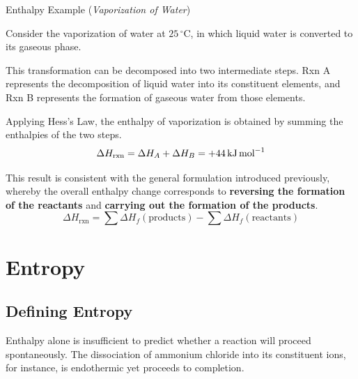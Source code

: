 \documentclass[10pt]{article}
\begin{document}
    \begin{core}{Enthalpy Example (\textit{Vaporization of Water})}

      Consider the vaporization of water at $25\,^\circ$C, in which liquid water is converted to its gaseous phase.


      This transformation can be decomposed into two intermediate steps. Rxn A represents the decomposition of liquid water into its constituent elements, and Rxn B represents the formation of gaseous water from those elements.



      Applying Hess's Law, the enthalpy of vaporization is obtained by summing the enthalpies of the two steps.
      \[
        \Delta H_{\text{rxn}} = \Delta H_{A} + \Delta H_{B} = +44\,\text{kJ\,mol}^{-1}
      \]

      This result is consistent with the general formulation introduced previously, whereby the overall enthalpy change corresponds to \textbf{reversing the formation of the reactants} and \textbf{carrying out the formation of the products}.
      \[
        \Delta H_{\text{rxn}} = \sum \Delta H_{f}(\text{products}) - \sum \Delta H_{f}(\text{reactants})
      \]

    \end{core}

\section{Entropy}

  \subsection{Defining Entropy}

    Enthalpy alone is insufficient to predict whether a reaction will proceed spontaneously. The dissociation of ammonium chloride into its constituent ions, for instance, is endothermic yet proceeds to completion.
\end{document}

